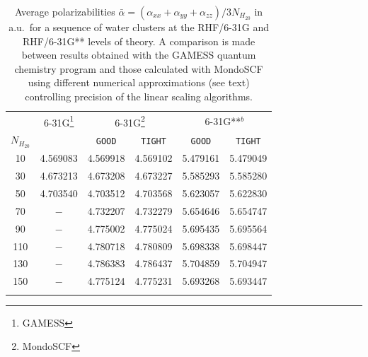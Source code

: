 \documentclass[prl,aps,twocolumn,showpacs,twocolumngrid,superbib]{revtex4}
\begin{document}
\begin{table}[t]
\caption{\protect Average polarizabilities $\bar{\alpha}=(\alpha_{xx}+\alpha_{yy}+\alpha_{zz})/3N_{H_20}$
         in a.u.~for a sequence of water clusters at the RHF/6-31G and RHF/6-31G** levels of theory.
         A comparison is made between results obtained with the {\sc GAMESS} quantum chemistry program
         \cite{gamess} and those calculated with {\sc MondoSCF} using different numerical approximations
         (see text) controlling precision of the linear scaling algorithms.}\label{tab:Polari_Values}
\begin{tabular}{cccccc}
\toprule 
      &\multicolumn{1}{c}{6-31G\footnote[1]{\sc GAMESS}}
      &\multicolumn{2}{c}{6-31G\footnote[2]{{\sc MondoSCF}}}
      &\multicolumn{2}{c}{6-31G**$^b$}\\
      $N_{H_20}$ &          & {\tt GOOD}     & {\tt TIGHT}    &  {\tt GOOD}    & {\tt TIGHT}   \\
      \hline
      10  & 4.569083 & 4.569918 & 4.569102 & 5.479161 & 5.479049  \\
      30  & 4.673213 & 4.673208 & 4.673227 & 5.585293 & 5.585280  \\
      50  & 4.703540 & 4.703512 & 4.703568 & 5.623057 & 5.622830  \\
      70  & $-$      & 4.732207 & 4.732279 & 5.654646 & 5.654747  \\
      90  & $-$      & 4.775002 & 4.775024 & 5.695435 & 5.695564  \\
      110 & $-$      & 4.780718 & 4.780809 & 5.698338 & 5.698447  \\
      130 & $-$      & 4.786383 & 4.786437 & 5.704859 & 5.704947  \\
      150 & $-$      & 4.775124 & 4.775231 & 5.693268 & 5.693447  \\
\botrule
\end{tabular}
\end{table}
\end{document}
